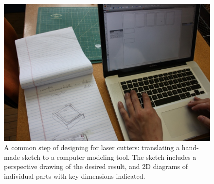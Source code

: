 \begin{figure}[t]
  \centering
  \includegraphics[width=0.7\linewidth]{img/translate-sketch-to-computer.jpg}
  \caption[Translating paper sketch to computer model]{A common step
    of designing for laser cutters: translating a hand-made sketch to
    a computer modeling tool. The sketch includes a perspective
    drawing of the desired result, and 2D diagrams of individual parts
    with key dimensions indicated.}
  \label{fig:translate}
\end{figure}
